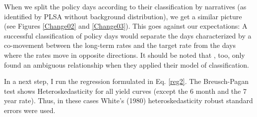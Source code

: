 \documentclass[11pt,a4paper,english,oneside]{book}
\numberwithin{equation}{chapter}
\begin{document}
When we split the policy days according to their classification by narratives (as identified by PLSA without background distribution), we get a similar picture (see Figures \ref{Change02} and \ref{Change03}). This goes against our expectations: A successful classification of policy days would separate the days characterized by a co-movement between the long-term rates and the target rate from the days where the rates move in opposite directions. It should be noted that \citet[p. 14--15]{Ellingsen.2003}, too, only found an ambiguous relationship when they applied their model of classification. 

In a next step, I run the regression formulated in Eq. \ref{reg2}. The Breusch-Pagan test shows Heteroskedasticity for all yield curves (except the 6 month and the 7 year rate). Thus, in these cases White’s (1980) heteroskedasticity robust standard errors were used.  
\end{document}
